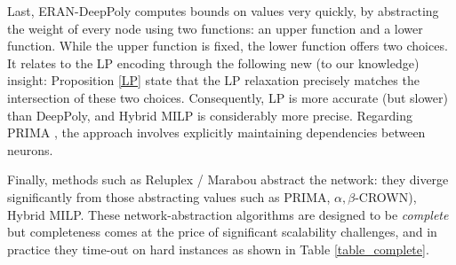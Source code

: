 Last, ERAN-DeepPoly \cite{deeppoly} computes bounds on values very quickly, by abstracting the weight of every node using two functions: an upper function and a lower function. While the upper function is fixed, the lower function offers two choices.
It relates to the LP encoding through the following new (to our knowledge) insight:  Proposition \ref{LP} state that the LP relaxation precisely matches the intersection of these two choices. Consequently, LP is more accurate (but slower) than DeepPoly, and Hybrid MILP is considerably more precise. Regarding PRIMA \cite{prima}, the approach involves explicitly maintaining dependencies between neurons.




Finally, methods such as Reluplex / Marabou \cite{Reluplex,Marabou}  abstract the network: they diverge significantly from those abstracting values such as PRIMA, $\alpha,\beta$-CROWN)\cite{prima,crown}, Hybrid MILP. 
These network-abstraction algorithms are designed to be {\em complete} but completeness comes at the price of significant scalability challenges, and in practice they time-out on hard instances as shown in Table \ref{table_complete}.